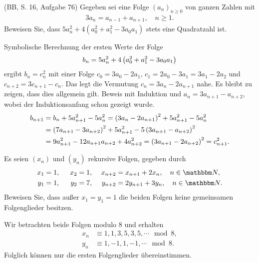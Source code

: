 \documentclass[11pt,a4paper]{article}
\begin{document}
\begin{aufgabe} (BB, S. 16, Aufgabe 76)
Gegeben sei eine Folge $(a_n)_{n\ge 0}$ von ganzen Zahlen mit
\begin{gather*}
3 a_{n}= a_{n-1}  +a_{n+1}, \quad n\ge 1.
\end{gather*}
Beweisen Sie, dass $5a_n^2 +4( a_0^2 +a_1^2 -3a_0a_1) $ stets eine Quadratzahl
ist.
\end{aufgabe}

\begin{loesung}
  Symbolische Berechnung der ersten Werte der Folge
\begin{gather*}
  b_n=5a_n^2+4\left(a_0^2+a_1^2-3a_0a_1\right)
\end{gather*}
ergibt $b_n=c_n^2$ mit einer Folge $c_0=3a_0-2a_1$, $c_1=2a_0-3a_1=3a_1-2a_2$
und $c_{n+2}=3c_{n+1}-c_n$.  Das legt die Vermutung $c_n=3a_n-2a_{n+1}$ nahe.
Es bleibt zu zeigen, dass dies allgemein gilt.  Beweis mit Induktion und
$a_n=3a_{n+1}-a_{n+2}$, wobei der Induktionsanfang schon gezeigt wurde.
\begin{align*}
  b_{n+1}&=b_n+5a_{n+1}^2-5a_n^2=\left(3a_n-2a_{n+1}\right)^2+5a_{n+1}^2-5a_n^2\\
  &=\left(7a_{n+1}-3a_{n+2}\right)^2+5a_{n+1}^2-5\left(3a_{n+1}-a_{n+2}\right)^2\\
  &=9a_{n+1}^2-12a_{n+1}a_{n+2}+4a_{n+2}^2=\left(3a_{n+1}-2a_{n+2}\right)^2=c_{n+1}^2.
\end{align*}
\end{loesung}

\begin{aufgabe} 
Es seien $(x_n)$ und $(y_n)$ rekursive Folgen, gegeben durch
\begin{alignat*}{3}
x_1&=1,\,\,& x_2& = 1,& \,\, x_{n+2}& =x_{n+1} +2 x_{n} ,\quad n\in\N,\\
y_1&= 1,&\,\, y_2&= 7,&\,\, y_{n+2}& = 2y_{n+1} +3 y_{n},\quad n\in \N.
\end{alignat*}
Beweisen Sie, dass außer $x_1=y_1=1$ die beiden Folgen keine gemeinsamen
Folgenglieder besitzen.
\end{aufgabe}

\begin{loesung} Wir betrachten beide Folgen modulo $8$ und erhalten
\begin{align*}
x_n&\equiv 1,1,3,5,3,5,\cdots \mod{8},\\
y_n&\equiv  1,-1,1,-1,\cdots \mod{8}.
\end{align*}
Folglich können nur die ersten Folgenglieder übereinstimmen.
\end{loesung}
\end{document}
